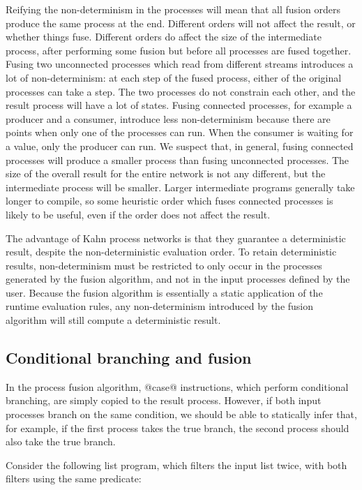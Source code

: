 Reifying the non-determinism in the processes will mean that all fusion orders produce the same process at the end.
Different orders will not affect the result, or whether things fuse.
Different orders do affect the size of the intermediate process, after performing some fusion but before all processes are fused together.
Fusing two unconnected processes which read from different streams introduces a lot of non-determinism: at each step of the fused process, either of the original processes can take a step.
The two processes do not constrain each other, and the result process will have a lot of states.
Fusing connected processes, for example a producer and a consumer, introduce less non-determinism because there are points when only one of the processes can run.
When the consumer is waiting for a value, only the producer can run.
We suspect that, in general, fusing connected processes will produce a smaller process than fusing unconnected processes.
The size of the overall result for the entire network is not any different, but the intermediate process will be smaller.
Larger intermediate programs generally take longer to compile, so some heuristic order which fuses connected processes is likely to be useful, even if the order does not affect the result.

The advantage of Kahn process networks is that they guarantee a deterministic result, despite the non-deterministic evaluation order.
To retain deterministic results, non-determinism must be restricted to only occur in the processes generated by the fusion algorithm, and not in the input processes defined by the user.
Because the fusion algorithm is essentially a static application of the runtime evaluation rules, any non-determinism introduced by the fusion algorithm will still compute a deterministic result.

\subsection{Conditional branching and fusion}
In the process fusion algorithm, @case@ instructions, which perform conditional branching, are simply copied to the result process.
However, if both input processes branch on the same condition, we should be able to statically infer that, for example, if the first process takes the true branch, the second process should also take the true branch.

Consider the following list program, which filters the input list twice, with both filters using the same predicate:


